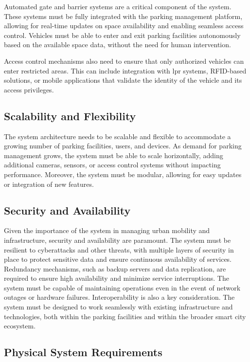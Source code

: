 Automated gate and barrier systems are a critical component of the system. These systems must be fully integrated with the parking management platform, allowing for real-time updates on space availability and enabling seamless access control. Vehicles must be able to enter and exit parking facilities autonomously based on the available space data, without the need for human intervention.

Access control mechanisms also need to ensure that only authorized vehicles can enter restricted areas. This can include integration with \gls{lpr} systems, RFID-based solutions, or mobile applications that validate the identity of the vehicle and its access privileges.

\subsection{Scalability and Flexibility}

The system architecture needs to be scalable and flexible to accommodate a growing number of parking facilities, users, and devices. As demand for parking management grows, the system must be able to scale horizontally, adding additional cameras, sensors, or access control systems without impacting performance. Moreover, the system must be modular, allowing for easy updates or integration of new features.

\subsection{Security and Availability}

Given the importance of the system in managing urban mobility and infrastructure, security and availability are paramount. The system must be resilient to cyberattacks and other threats, with multiple layers of security in place to protect sensitive data and ensure continuous availability of services. Redundancy mechanisms, such as backup servers and data replication, are required to ensure high availability and minimize service interruptions. The system must be capable of maintaining operations even in the event of network outages or hardware failures. Interoperability is also a key consideration. The system must be designed to work seamlessly with existing infrastructure and technologies, both within the parking facilities and within the broader smart city ecosystem.

\subsection{Physical System Requirements}

